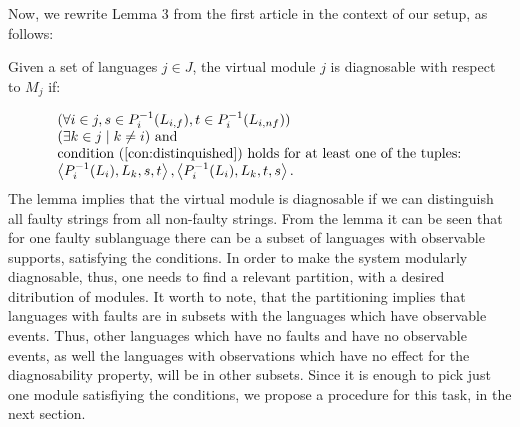 \documentclass[a4paper, 10pt, conference]{ieeeconf}
\begin{document}
Now, we rewrite Lemma 3 from the first article in the context of our setup, as
follows:
\begin{lemma}
\label{lem:virtual_module_is_diagnosable}
Given a set of languages $j \in J$, the virtual module $j$ is diagnosable with
respect to $M_j$ if:
\end{lemma}
\begin{equation}
	\begin{array}{l}
		(\forall i \in j, 
			s \in P_i^{-1}(L_{i,f}), 
			t \in P_i^{-1}(L_{i,nf}))
		\\
		(\exists k \in j \mid k \neq i) \textrm{ and }
		\\
		\textrm{condition (\ref{con:distinquished}) holds for at least one of
		the tuples:}
		\\
		\left<P_i^{-1}(L_i), L_k, s, t \right>,
		\left<P_i^{-1}(L_i), L_k, t, s \right>.
	\end{array}
\end{equation}
The lemma implies that the virtual module is diagnosable if we can distinguish
all faulty strings from all non-faulty strings. 
From the lemma it can be seen that for one faulty sublanguage there can be a
subset of languages with observable supports, satisfying the conditions. In
order to make the system modularly diagnosable, thus, one needs to find a
relevant partition, with a desired ditribution of modules. It worth to note,
that the partitioning implies that languages with faults are in subsets with the
languages which have observable events. Thus, other languages which have no
faults and have no observable events, as well the languages with observations
which have no effect for the diagnosability property, will be in other subsets.
Since it is enough to pick just one module satisfiying the conditions, we
propose a procedure for this task, in the next section.
\end{document}
